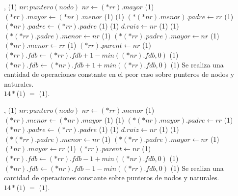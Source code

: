 {   ,
    }
{}
{\bigo(1)}
{   \var $nr : puntero(nodo)$
    \State $nr \gets (*rr).mayor$                               \comment \bigo(1)
    \State $(*rr).mayor \gets (*nr).menor$                      \comment \bigo(1)
                                  \comment \bigo(1)
        \State $(*(*nr).menor).padre \gets rr$                  \comment \bigo(1)
    \EndIf
    \State $(*nr).padre \gets (*rr).padre$                      \comment \bigo(1)
                                     \comment \bigo(1)
        \State $d.raiz \gets nr$                                \comment \bigo(1)
    \Else
                              \comment \bigo(1)
            \State $(*(*rr).padre).menor \gets nr$              \comment \bigo(1)
        \Else
            \State $(*(*rr).padre).mayor \gets nr$              \comment \bigo(1)
        \EndIf
    \EndIf
    \State $(*nr).menor \gets rr$                               \comment \bigo(1)
    \State $(*rr).parent \gets nr$                              \comment \bigo(1)
    \State $(*rr).fdb \gets (*rr).fdb + 1 - min((*nr).fdb, 0)$  \comment \bigo(1)
    \State $(*nr).fdb \gets (*nr).fdb + 1 + min((*rr).fdb, 0)$  \comment \bigo(1)
}
{   Se realiza una cantidad de operaciones constante en el peor caso sobre punteros de nodos y
    naturales. \\
    \hspace*{8em} $14*$\bigo($1$) $=$ \bigo($1$). }

{   ,
    }
{}
{\bigo(1)}
{   \var $nr : puntero(nodo)$                                   
    \State $nr \gets (*rr).menor$                               \comment \bigo(1)
    \State $(*rr).menor \gets (*nr).mayor$                      \comment \bigo(1)
                                  \comment \bigo(1)
        \State $(*(*nr).mayor).padre \gets rr$                  \comment \bigo(1)
    \EndIf
    \State $(*nr).padre \gets (*rr).padre$                      \comment \bigo(1)
                                     \comment \bigo(1)
        \State $d.raiz \gets nr$                                \comment \bigo(1)
    \Else
                              \comment \bigo(1)
            \State $(*(*rr).padre).menor \gets nr$              \comment \bigo(1)
        \Else
            \State $(*(*rr).padre).mayor \gets nr$              \comment \bigo(1)
        \EndIf
    \EndIf
    \State $(*nr).mayor \gets rr$                               \comment \bigo(1)
    \State $(*rr).parent \gets nr$                              \comment \bigo(1)
    \State $(*rr).fdb \gets (*rr).fdb - 1 + min((*nr).fdb, 0)$  \comment \bigo(1)
    \State $(*nr).fdb \gets (*nr).fdb - 1 - min((*rr).fdb, 0)$  \comment \bigo(1)
}
{   Se realiza una cantidad de operaciones constante sobre punteros de nodos y
    naturales. \\
    \hspace*{8em} $14*$\bigo($1$) $=$ \bigo($1$). }

